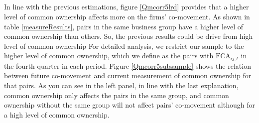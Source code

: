 		\FloatBarrier
		
		
		
		\subsection{}
		\begin{LTR}
			In line with the previous estimations, figure \ref{Qmcorr5lrd} provides that a higher level of common ownership affects more on the firms' co-movement. As shown in table \ref{measureResults}, pairs in the same business group have a higher level of common ownership than others. So, the previous results could be drive from high level of common ownership For detailed analysis, we restrict our sample to the higher level of common ownership, which we define as the pairs with $\text{FCA}_{ij,t}$ in the fourth quarter in each period. Figure \ref{Qmcorr5subsample} shows the relation between future co-movement and current measurement of common ownership for that pairs. As you can see in the left panel, in line with the last explanation, common ownership only affects the pairs in the same group, and common ownership without the same group will not affect pairs' co-movement although for a high level of common ownership.
			

\end{LTR}
